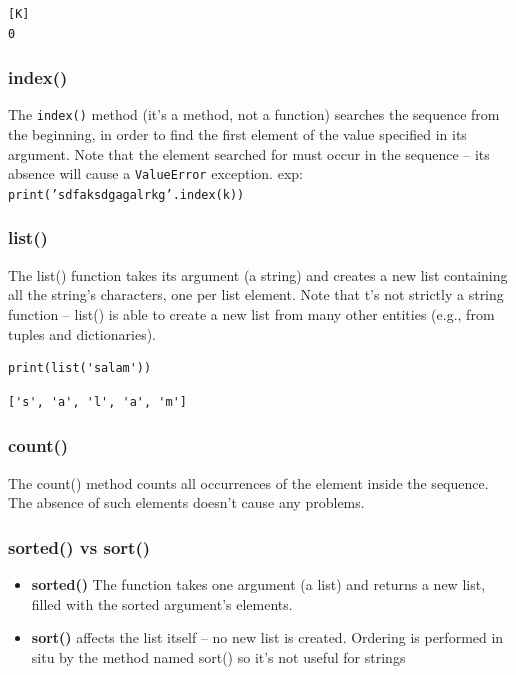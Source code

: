 \documentclass[11pt]{article}
\begin{document}
\begin{verbatim}
[K]
0
\end{verbatim}
\subsubsection{index()}
\label{sec:org5f5ccc7}
The \texttt{index()} method (it’s a method, not a function) searches the
sequence from the beginning, in order to find the first element of the
value specified in its argument. Note that the element searched for must
occur in the sequence – its absence will cause a \texttt{ValueError} exception.
exp: \texttt{print('sdfaksdgagalrkg'.index(k))}
\subsubsection{list()}
\label{sec:orga46de23}
The list() function takes its argument (a string) and creates a new
list containing all the string’s characters, one per list
element. Note that t’s not strictly a string function – list() is able
to create a new list from many other entities (e.g., from tuples and
dictionaries).

\begin{verbatim}
print(list('salam'))
\end{verbatim}

\begin{verbatim}
['s', 'a', 'l', 'a', 'm']
\end{verbatim}
\subsubsection{count()}
\label{sec:orgc1de9af}
The count() method counts all occurrences of the element inside the
sequence. The absence of such elements doesn’t cause any problems.
\subsubsection{sorted() vs sort()}
\label{sec:orgd3027dc}
\begin{itemize}
\item \textbf{sorted()} The function takes one argument (a list) and returns a new list,
filled with the sorted argument’s elements.
\item \textbf{sort()} affects the list itself – no new list is created. Ordering
is performed in situ by the method named sort() so it's not useful for strings
\end{itemize}
\end{document}
